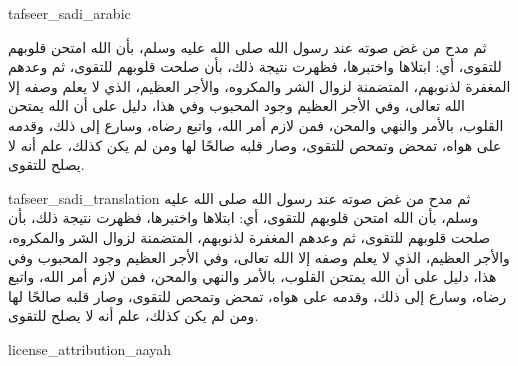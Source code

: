 \begin{taggedblock}{tafseer_sadi_arabic}
\begin{Arabic}
ثم مدح من غض صوته عند رسول الله صلى الله عليه وسلم، بأن الله امتحن قلوبهم للتقوى، أي: ابتلاها واختبرها، فظهرت نتيجة ذلك، بأن صلحت قلوبهم للتقوى، ثم وعدهم المغفرة لذنوبهم، المتضمنة لزوال الشر والمكروه، والأجر العظيم، الذي لا يعلم وصفه إلا الله تعالى، وفي الأجر العظيم وجود المحبوب  وفي هذا، دليل على أن الله يمتحن القلوب، بالأمر والنهي والمحن، فمن لازم أمر الله، واتبع رضاه، وسارع إلى ذلك، وقدمه على هواه، تمحض وتمحص للتقوى، وصار قلبه صالحًا لها ومن لم يكن كذلك، علم أنه لا يصلح للتقوى.
\end{Arabic}
\end{taggedblock}
\begin{taggedblock}{tafseer_sadi_translation}
ثم مدح من غض صوته عند رسول الله صلى الله عليه وسلم، بأن الله امتحن قلوبهم للتقوى، أي: ابتلاها واختبرها، فظهرت نتيجة ذلك، بأن صلحت قلوبهم للتقوى، ثم وعدهم المغفرة لذنوبهم، المتضمنة لزوال الشر والمكروه، والأجر العظيم، الذي لا يعلم وصفه إلا الله تعالى، وفي الأجر العظيم وجود المحبوب  وفي هذا، دليل على أن الله يمتحن القلوب، بالأمر والنهي والمحن، فمن لازم أمر الله، واتبع رضاه، وسارع إلى ذلك، وقدمه على هواه، تمحض وتمحص للتقوى، وصار قلبه صالحًا لها ومن لم يكن كذلك، علم أنه لا يصلح للتقوى.
\end{taggedblock}
\begin{taggedblock}{license_attribution_aayah}

\end{taggedblock}
\begin{comment}
Please use the following for footnotes:- Sample\footnoteQ{Text of Qur'an footnote goes here.}.
Sample\footnoteT{Text of Tafseer footnote goes here.}.
\end{comment}